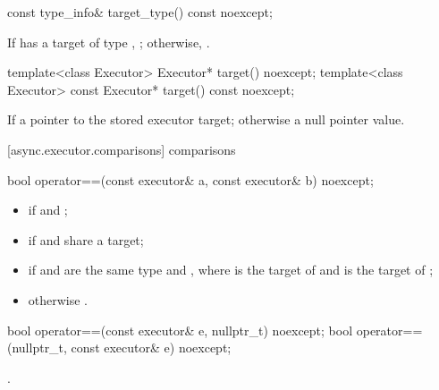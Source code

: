 %
\begin{itemdecl}
const type_info& target_type() const noexcept;
\end{itemdecl}

\begin{itemdescr}
\pnum
\returns If  has a target of type , ; otherwise, .
\end{itemdescr}

%
\begin{itemdecl}
template<class Executor> Executor* target() noexcept;
template<class Executor> const Executor* target() const noexcept;
\end{itemdecl}

\begin{itemdescr}
\pnum
\returns If  a pointer to the stored executor target; otherwise a null pointer value.
\end{itemdescr}



[async.executor.comparisons]{ comparisons}

%
\begin{itemdecl}
bool operator==(const executor& a, const executor& b) noexcept;
\end{itemdecl}

\begin{itemdescr}
\pnum
\returns 
\begin{itemize}
\item
{} if  and ;
\item
{} if  and  share a target;
\item
{} if  and  are the same type and , where  is the target of  and  is the target of ;
\item
 otherwise .
\end{itemize}
\end{itemdescr}

%
\begin{itemdecl}
bool operator==(const executor& e, nullptr_t) noexcept;
bool operator==(nullptr_t, const executor& e) noexcept;
\end{itemdecl}

\begin{itemdescr}
\pnum
\returns {}.
\end{itemdescr}

